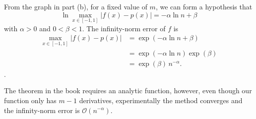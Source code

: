 \begin{solution}
  From the graph in part (b), for a fixed value of $m$, we can form a hypothesis that
  \[
    \ln \max_{x \in [-1, 1]} |f(x) - p(x)| = -\alpha \ln n + \beta
  \]
  with $\alpha > 0$ and $0 < \beta < 1$.
  The infinity-norm error of $f$ is
  \begin{align*}
    \max_{x \in [-1, 1]} |f(x) - p(x)| &= \exp(-\alpha \ln n + \beta)\\
    &= \exp(-\alpha \ln n) \exp(\beta)\\
    &= \exp(\beta) \, n^{-\alpha}.
  \end{align*}.
  
  The theorem in the book requires an analytic function, however, even though our function
  only has $m - 1$ derivatives, experimentally the method converges and
  the infinity-norm error is $\mathcal{O}(n^{-\alpha})$.
\end{solution}